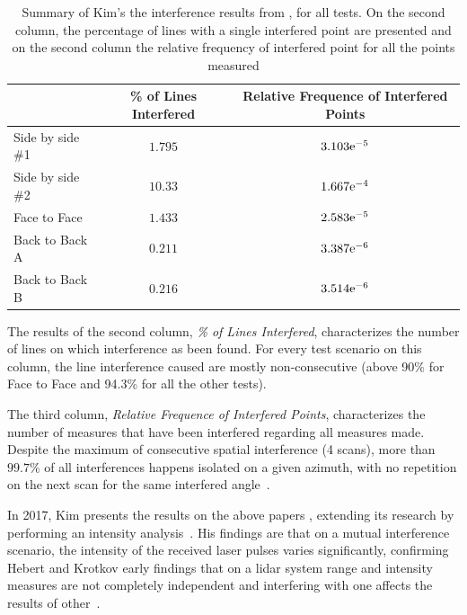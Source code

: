 \begin{table}[H]
	\centering
	\renewcommand{\arraystretch}{1.3}
		\begin{tabular}{@{}l|c|c@{}}
			                 & \% of Lines Interfered & Relative Frequence of Interfered Points \\ \midrule
			Side by side \#1 & $1.795$                & $3.103\mathrm{e}^{-5}$  \\
			Side by side \#2 & $10.33$                & $1.667\mathrm{e}^{-4}$ \\
			Face to Face     & $1.433$                & $2.583\mathrm{e}^{-5}$  \\
			Back to Back A   & $0.211$                & $3.387\mathrm{e}^{-6}$  \\
			Back to Back B   & $0.216$                & $3.514\mathrm{e}^{-6}$  \\ \bottomrule
		\end{tabular}%
		\caption{Summary of Kim's \etal the interference results from \cite{Kim2015b, Kim2015c}, for all tests. On the second column, the percentage of lines with a single interfered point are presented and on the second column the relative frequency of interfered point for all the points measured}
	\label{tab:kim_2015_results}
\end{table}

The results of the second column, \textit{\% of Lines Interfered}, characterizes the number of lines on which interference as been found. For every test scenario on this column, the line interference caused are mostly non-consecutive (above 90\% for Face to Face and 94.3\% for all the other tests).

The third column, \textit{Relative Frequence of Interfered Points}, characterizes the number of measures that have been interfered regarding all measures made. Despite the maximum of consecutive spatial interference (4 scans), more than $99.7\%$ of all interferences happens isolated on a given azimuth, with no repetition on the next scan for the same interfered angle~\cite{Kim2015c}.





In 2017, Kim \etal presents the results on the above papers \cite{Kim2015a, Kim2015b, Kim2015c}, extending its research by performing an intensity analysis~\cite{Kim2017}. His findings are that on a mutual interference scenario, the intensity of the received laser pulses varies significantly, confirming Hebert and Krotkov early findings that on a \ac{lidar} system range and intensity measures are not completely independent and interfering with one affects the results of other~\cite{Hebert}.

